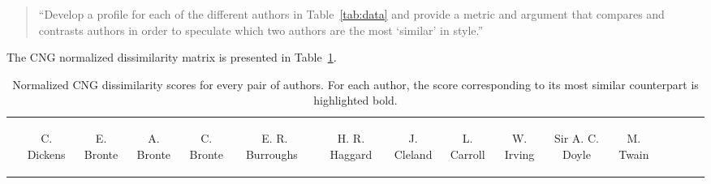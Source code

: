 \documentclass[conference]{IEEEtran}
\newcommand{\codefile}[1]{
  \begin{framed}
  \fontsize{5.65}{6.78}\selectfont
  
  \end{framed}
}
\begin{document}
\begin{quote}
``Develop a profile for each of the different authors in Table~\ref{tab:data} and provide 
a metric and argument that compares and contrasts authors in order to speculate which 
two authors are the most `similar' in style.''
\end{quote}

\codefile{problem1i.py}

The CNG normalized dissimilarity matrix is presented in Table~\ref{tab:problem1i}.

\begin{table}

\caption{\hspace{6em}Normalized CNG dissimilarity scores for every pair of authors. For each author, \newline
the score corresponding to its most similar counterpart is highlighted bold.\label{tab:problem1i}}
\vspace{-10pt}
\renewcommand{\arraystretch}{1.5}
\begin{center}
\begin{tabular}{r|ccccccccccccccc}
 & \begin{sideways}
C. Dickens
\end{sideways} & \begin{sideways}
E. Bronte
\end{sideways} & \begin{sideways}
A. Bronte
\end{sideways} & \begin{sideways}
C. Bronte
\end{sideways} & \begin{sideways}
E. R. Burroughs~
\end{sideways} & \begin{sideways}
H. R. Haggard
\end{sideways} & \begin{sideways}
J. Cleland
\end{sideways} & \begin{sideways}
L. Carroll
\end{sideways} & \begin{sideways}
W. Irving
\end{sideways} & \begin{sideways}
Sir A. C. Doyle
\end{sideways} & \begin{sideways}
M. Twain
\end{sideways} & \begin{sideways}

\end{sideways}
\end{tabular}
\end{center}
\end{table}
\end{document}
